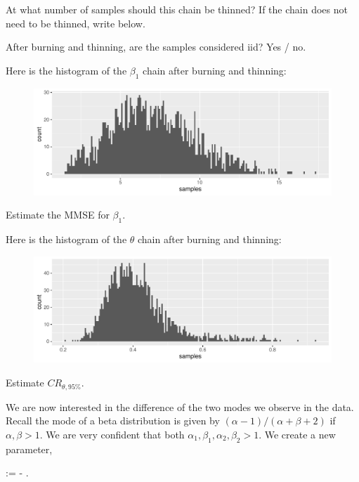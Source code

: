 \documentclass[12pt]{article}
\begin{document}
\begin{enumerate}
 At what number of samples should this chain be thinned? If the chain does not need to be thinned, write  below. 

 After burning and thinning, are the samples considered iid? Yes / no. 

Here is the histogram of the $\beta_1$ chain after burning and thinning:

\begin{figure}[htp]
\centering
\includegraphics[width=6in]{beta_1_posterior}
\end{figure}

 Estimate the MMSE for $\beta_1$. 


Here is the histogram of the $\theta$ chain after burning and thinning:

\begin{figure}[htp]
\centering
\includegraphics[width=5.5in]{theta_posterior}
\end{figure}


 Estimate $CR_{\theta, 95\%}$.

We are now interested in the difference of the two modes we observe in the data. Recall the mode of a beta distribution is given by $(\alpha-1)/(\alpha+\beta+2)$ if $\alpha, \beta >1$. We are very confident that both $\alpha_1, \beta_1, \alpha_2, \beta_2 >1$. We create a new parameter,

\beqn
\tau :=  - .
\eeqn


\end{enumerate}
\end{document}
